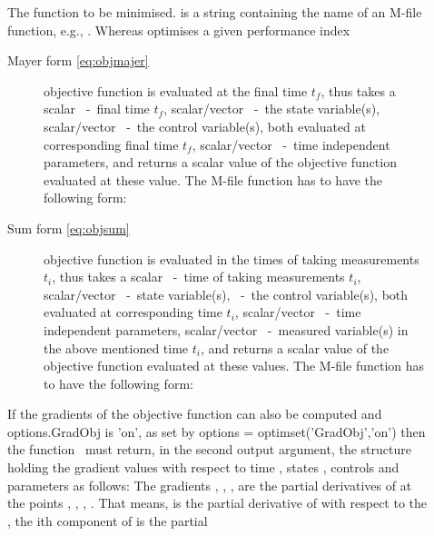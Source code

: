 \begin{description}
\item[] The function to be minimised. 
  is a string containing the name of an M-file function, e.g.,
  . Whereas  optimises a given performance
  index 
  \begin{description}
  \item[Mayer form \eqref{eq:objmajer}] objective function is
    evaluated at the final time $t_{f}$, thus  takes a
    scalar ~-~final time $t_{f}$, scalar/vector
    ~-~the state variable(s), scalar/vector ~-~the
    control variable(s), both evaluated at corresponding  final time
    $t_{f}$, scalar/vector ~-~time independent parameters,
    and returns a scalar value  of the objective function
    evaluated at these value. The M-file function has to have the
    following form: 
    {\small } 
  \item[Sum form \eqref{eq:objsum}] objective function is evaluated in
    the times of taking measurements $t_{i}$, thus  takes
    a scalar ~-~time of taking measurements $t_{i}$,
    scalar/vector ~-~state variable(s), ~-~the
    control variable(s), both evaluated at corresponding time $t_{i}$,
    scalar/vector ~-~time independent parameters,
    scalar/vector ~-~measured variable(s) in the above
    mentioned time $t_{i}$, and returns a scalar value  of
    the objective function evaluated at these values. The M-file
    function has to have the following form:   
    {\small } 
   \end{description}
   If the gradients of the objective function can also be computed
   and options.GradObj is 'on', as set by options =
   optimset('GradObj','on') then the function~ must return,
   in the second output argument, the structure  holding the
   gradient values with respect to time , states ,
   controls  and parameters  as follows:
   {\small }
   The gradients , , ,
    are the partial derivatives of  at the
   points , , , . That means,
    is the partial derivative of  with respect
   to the , the ith component of  is the partial

\end{description}
